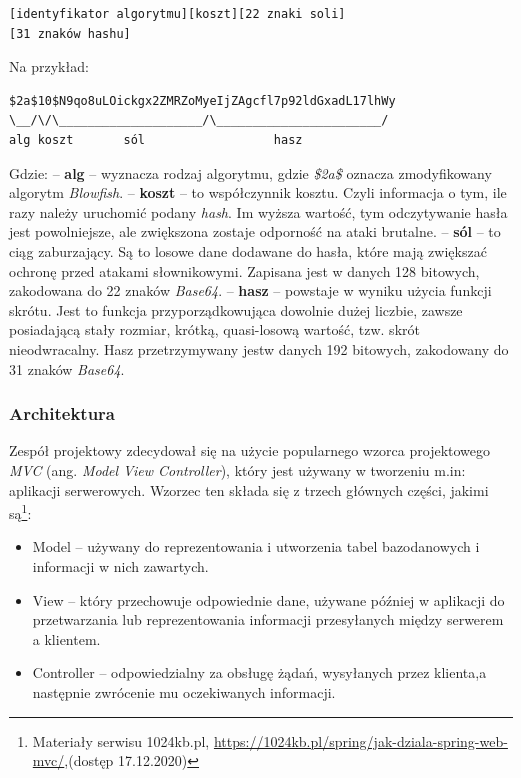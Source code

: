 \documentclass[twoside]{projektInzynierskiMS}
\numberwithin{figure}{section}
\begin{document}
\begin{description}
    \begin{lstlisting}[caption=Sposób w jaki jest zapisywany ciąg bcrypt. Źródło: Opracowanie własne.,captionpos=b]
[identyfikator algorytmu][koszt][22 znaki soli]
[31 znaków hashu]
    \end{lstlisting}
    Na przykład:
    \begin{lstlisting}[caption=Przykładowy ciąg bcrypt. Źródło: Opracowanie własne.,captionpos=b]
$2a$10$N9qo8uLOickgx2ZMRZoMyeIjZAgcfl7p92ldGxadL17lhWy 
\__/\/\____________________/\_______________________/
alg koszt       sól                  hasz
    \end{lstlisting}
Gdzie: \newline
    – \textbf{alg} – wyznacza rodzaj algorytmu, gdzie \textit{\$2a\$} oznacza zmodyfikowany algorytm \textit{Blowfish}. \newline
    – \textbf{koszt} – to współczynnik kosztu. Czyli informacja o tym, ile razy należy uruchomić podany \textit{hash}. Im wyższa wartość, tym odczytywanie hasła jest powolniejsze, ale zwiększona zostaje odporność na ataki brutalne. \newline
    – \textbf{sól} – to ciąg zaburzający. Są to losowe dane dodawane do hasła, które mają zwiększać ochronę przed atakami słownikowymi. Zapisana jest w danych 128 bitowych, zakodowana do 22 znaków \textit{Base64}. \newline
    – \textbf{hasz} – powstaje w wyniku użycia funkcji skrótu. Jest to funkcja przyporządkowująca dowolnie dużej liczbie, zawsze posiadającą stały rozmiar, krótką, quasi-losową wartość, tzw. skrót nieodwracalny. Hasz przetrzymywany jest\linebreak w danych 192 bitowych, zakodowany do 31 znaków \textit{Base64}.
\end{description}

\subsubsection{Architektura}
Zespół projektowy zdecydował się na użycie popularnego wzorca projektowego \textit{MVC} (ang. \textit{Model View Controller}), który jest używany w tworzeniu m.in: aplikacji serwerowych. Wzorzec ten składa się z trzech głównych części, jakimi są\footnote{Materiały serwisu 1024kb.pl, \url{https://1024kb.pl/spring/jak-dziala-spring-web-mvc/},\newline (dostęp 17.12.2020)}:
\begin{itemize}
    \item Model – używany do reprezentowania i utworzenia tabel bazodanowych i informacji w nich zawartych.
    \item View – który przechowuje odpowiednie dane, używane później w aplikacji do przetwarzania lub reprezentowania informacji przesyłanych między serwerem a klientem.
    \item Controller – odpowiedzialny za obsługę żądań, wysyłanych przez klienta,\linebreak a następnie zwrócenie mu oczekiwanych informacji.
\end{itemize}
\end{document}
